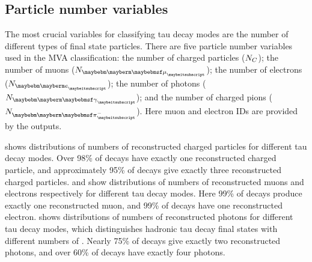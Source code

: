 \subsection{Particle number variables}

The most crucial variables for classifying tau decay modes  are the number of different types of final state particles. There are five particle number  variables used in the MVA classification: the number of charged particles (${N}_{C}$); the number of muons (${N}_{\Pmu}$); the number of electrons (${N}_{\Pe}$); the number of photons (${N}_{\Pgg}$); and the number of charged pions (${N}_{\Pgpm}$). Here muon and electron IDs are provided by the \pandora outputs.


 shows  distributions of numbers of reconstructed charged particles for different tau decay modes. Over 98\% of   \tauToPion decays have exactly one reconstructed charged particle, and approximately 95\% of \decayAiPionShort decays give exactly three reconstructed charged particles.  and   show distributions of numbers of reconstructed muons and electrons respectively for different tau decay modes. Here 99\% of \tauToMuon decays produce exactly one reconstructed muon, and 99\% of \tauToElectron decays have one reconstructed electron.  shows  distributions of numbers of reconstructed photons  for different tau decay modes, which distinguishes hadronic tau decay final states with different numbers of \Ppizero.  Nearly 75\% of  \decayRhoShort  decays give exactly two reconstructed photons, and over 60\% of \decayAiPhotonShort decays have exactly four photons.




